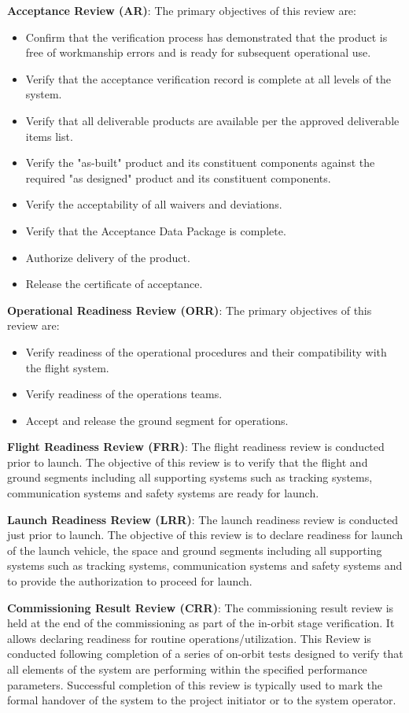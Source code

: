 \textbf{Acceptance Review (AR)}: The primary objectives of this review are:
\begin{itemize}
\item Confirm that the verification process has demonstrated that the product is free of workmanship errors and is ready for subsequent operational use.
\item Verify that the acceptance verification record is complete at all levels of the system.
\item Verify that all deliverable products are available per the approved deliverable items list.
\item Verify the "as-built" product and its constituent components against the required "as designed" product and its constituent components.
\item Verify the acceptability of all waivers and deviations.
\item Verify that the Acceptance Data Package is complete.
\item Authorize delivery of the product.
\item Release the certificate of acceptance.
\end{itemize}

\textbf{Operational Readiness Review (ORR)}: The primary objectives of this review are:
\begin{itemize}
\item Verify readiness of the operational procedures and their compatibility with the flight system.
\item Verify readiness of the operations teams.
\item Accept and release the ground segment for operations.
\end{itemize}

\textbf{Flight Readiness Review (FRR)}: The flight readiness review is conducted prior to launch. The objective of this review is to verify that the flight and ground segments including all supporting systems such as tracking systems, communication systems and safety systems are ready for launch.

\textbf{Launch Readiness Review (LRR)}: The launch readiness review is conducted just prior to launch. The objective of this review is to declare readiness for launch of the launch vehicle, the space and ground segments including all supporting systems such as tracking systems, communication systems and safety systems and to provide the authorization to proceed for launch.

\textbf{Commissioning Result Review (CRR)}: The commissioning result review is held at the end of the commissioning as part of the in-orbit stage verification. It allows declaring readiness for routine operations/utilization. This Review is conducted following completion of a series of on-orbit tests designed to verify that all elements of the system are performing within the specified performance parameters. Successful completion of this review is typically used to mark the formal handover of the system to the project initiator or to the system operator.

